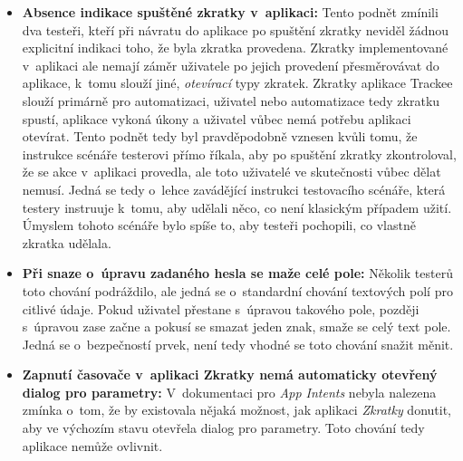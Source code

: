 \begin{itemize}
\item\textbf{Absence indikace spuštěné zkratky v~aplikaci:} Tento podnět zmínili dva testeři, kteří při návratu do aplikace po spuštění zkratky neviděl žádnou explicitní indikaci toho, že byla zkratka provedena. Zkratky implementované v~aplikaci ale nemají záměr uživatele po jejich provedení přesměrovávat do aplikace, k~tomu slouží jiné, \emph{otevírací} typy zkratek. Zkratky aplikace Trackee slouží primárně pro automatizaci, uživatel nebo automatizace tedy zkratku spustí, aplikace vykoná úkony a uživatel vůbec nemá potřebu aplikaci otevírat. Tento podnět tedy byl pravděpodobně vznesen kvůli tomu, že instrukce scénáře testerovi přímo říkala, aby po spuštění zkratky zkontroloval, že se akce v~aplikaci provedla, ale toto uživatelé ve skutečnosti vůbec dělat nemusí. Jedná se tedy o~lehce zavádějící instrukci testovacího scénáře, která testery instruuje k~tomu, aby udělali něco, co není klasickým případem užití. Úmyslem tohoto scénáře bylo spíše to, aby testeři pochopili, co vlastně zkratka udělala.
\item\textbf{Při snaze o~úpravu zadaného hesla se maže celé pole:} Několik testerů toto chování podráždilo, ale jedná se o~standardní chování textových polí pro citlivé údaje. Pokud uživatel přestane s~úpravou takového pole, později s~úpravou zase začne a pokusí se smazat jeden znak, smaže se celý text pole. Jedná se o~bezpečností prvek, není tedy vhodné se toto chování snažit měnit.
\item\textbf{Zapnutí časovače v~aplikaci Zkratky nemá automaticky otevřený dialog pro parametry:} V~dokumentaci pro \emph{App Intents} \cite{ios-app-intents} nebyla nalezena zmínka o~tom, že by existovala nějaká možnost, jak aplikaci \emph{Zkratky} donutit, aby ve výchozím stavu otevřela dialog pro parametry. Toto chování tedy aplikace nemůže ovlivnit.
\end{itemize}































































